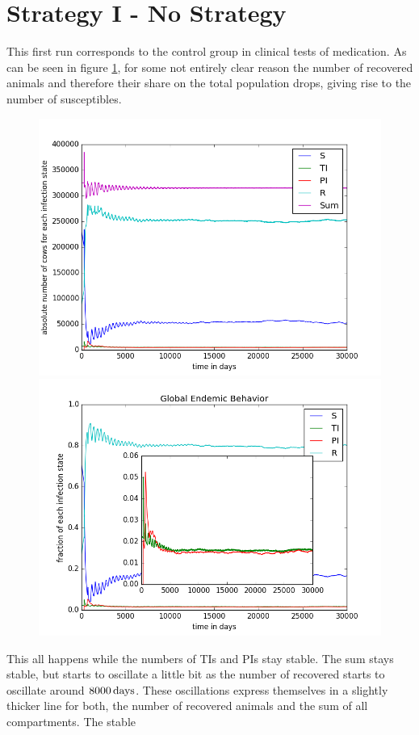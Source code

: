 \section{Strategy I - No Strategy}
This first run corresponds to the control group in clinical tests of medication. As can be seen in figure \ref{fig:cont1Behav}, for some not entirely clear reason the number of recovered animals and therefore their share on the total population drops, giving rise to the number of susceptibles. 
\begin{figure}[htbp]
\begin{minipage}{0.5\textwidth}
\centering
\noindent\includegraphics[width=0.95\linewidth,height=\textheight,
keepaspectratio]{cont1totalEndemicNumbers.png} 
\end{minipage}
\begin{minipage}{0.5\textwidth}
\centering
\noindent\includegraphics[width=0.95\linewidth,height=\textheight,
keepaspectratio]{cont1endemicFractions.png} 
\end{minipage}
\caption[Endemic Behavior in Containment Strategy One]{}
\label{fig:cont1Behav}
\end{figure} 
This all happens while the numbers of TIs and PIs stay stable. The sum stays stable, but starts to oscillate a little bit as the number of recovered starts to oscillate around $8000\,\text{days}$. These oscillations express themselves in a slightly thicker line for both, the number of recovered animals and the sum of all compartments. The stable 

